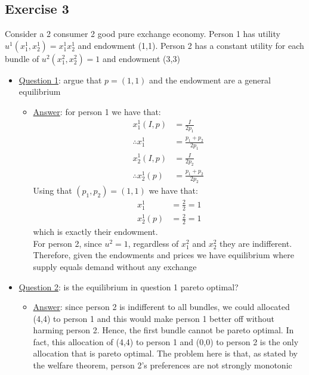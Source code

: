 \documentclass{article}
\begin{document}
\subsection{Exercise 3}
Consider a 2 consumer 2 good pure exchange economy. Person 1 has utility $u^{1}(x_{1}^{1},x_{2}^{1}) = x_{1}^{1}x_{2}^{1}$ and endowment (1,1). Person 2 has a constant utility for each bundle of $u^{2}(x_{1}^{2},x_{2}^{2}) = 1$ and endowment (3,3)
  \par \vspace{0.3em}
  \begin{itemize}
    \item  \underline{Question 1}: argue that $p = (1,1)$ and the endowment are a general equilibrium
    \begin{itemize}
      \item  \underline{Answer}: for person 1 we have that:
      \begin{align*}
        x_{1}^{1}(I,p) &= \frac{I}{2p_{1}} \\
        \therefore x_{1}^{1} &= \frac{p_{1} + p_{2}}{2p_{1}} \ \tag{1} \\
        x_{2}^{1}(I,p) &= \frac{I}{2p_{2}} \\
        \therefore x_{2}^{1}(p) &= \frac{p_{1} + p_{2}}{2p_{2}} \ \tag{2}
      \end{align*}
      Using that $(p_{1}, p_{2}) = (1,1)$ we have that:
      \begin{align*}
        x_{1}^{1} &= \frac{2}{2} = 1  \\
        x_{2}^{1}(p) &= \frac{2}{2}  = 1
      \end{align*}
      which is exactly their endowment. \\
      For person 2, since $u^{2} = 1$, regardless of $x_{1}^{2}$ and $x_{2}^{2}$ they are indifferent. Therefore, given the endowments and prices we have equilibrium where supply equals demand without any exchange
    \end{itemize}
  \end{itemize}
  \begin{itemize}
    \item  \underline{Question 2}: is the equilibrium in question 1 pareto optimal?
    \begin{itemize}
      \item  \underline{Answer}: since person 2 is indifferent to all bundles, we could allocated (4,4) to person 1 and this would make person 1 better off without harming person 2. Hence, the first bundle cannot be pareto optimal. In fact, this allocation of (4,4) to person 1 and (0,0) to person 2 is the only allocation that is pareto optimal. The problem here is that, as stated by the welfare theorem, person 2's preferences are not strongly monotonic
    \end{itemize}
  \end{itemize}
\end{document}
